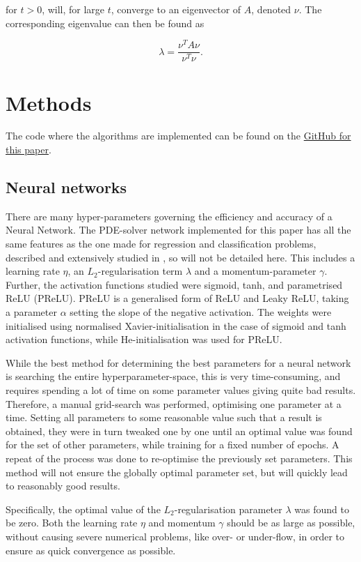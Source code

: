 \documentclass[multicolumn, 9pt]{extarticle}
\begin{document}
for $t>0$, will, for large $t$, converge to an eigenvector of $A$, denoted $\nu$. The corresponding eigenvalue can then be found as

\begin{equation}
\label{eq:eigval}
	\lambda = \frac{\nu^TA\nu}{\nu^T\nu}.
\end{equation}


\section{Methods}
The code where the algorithms are implemented can be found on the \href{https://github.com/SaraPJensen/FYS-STK/tree/main/Project3/code}{GitHub for this paper}.

\subsection{Neural networks}
There are many hyper-parameters governing the efficiency and accuracy of a Neural Network. The PDE-solver network implemented for this paper has all the same features as the one made for regression and classification problems, described and extensively studied in \cite{p2HO}, so will not be detailed here. This includes a learning rate $\eta$, an $L_2$-regularisation term $\lambda$ and a momentum-parameter $\gamma$. Further, the activation functions studied were sigmoid, tanh, and parametrised ReLU (PReLU). PReLU is a generalised form of ReLU and Leaky ReLU, taking a parameter $\alpha$ setting the slope of the negative activation. The weights were initialised using normalised Xavier-initialisation in the case of sigmoid and tanh activation functions, while He-initialisation was used for PReLU.

While the best method for determining the best parameters for a neural network is searching the entire hyperparameter-space, this is very time-consuming, and requires spending a lot of time on some parameter values giving quite bad results. Therefore, a manual grid-search was performed, optimising one parameter at a time. Setting all parameters to some reasonable value such that a result is obtained, they were in turn tweaked one by one until an optimal value was found for the set of other parameters, while training for a fixed number of epochs. A repeat of the process was done to re-optimise the previously set parameters. This method will not ensure the globally optimal parameter set, but will quickly lead to reasonably good results.

Specifically, the optimal value of the $L_2$-regularisation parameter $\lambda$ was found to be zero. Both the learning rate $\eta$ and momentum $\gamma$ should be as large as possible, without causing severe numerical problems, like over- or under-flow, in order to ensure as quick convergence as possible.
\end{document}
